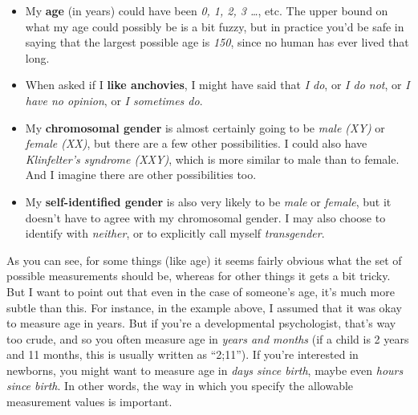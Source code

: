 \documentclass[
]{book}
\providecommand{\tightlist}{%
  \setlength{\itemsep}{0pt}\setlength{\parskip}{0pt}}
\begin{document}
\begin{itemize}
\tightlist
\item
  My \textbf{age} (in years) could have been \emph{0, 1, 2, 3 \ldots{}}, etc. The upper bound on what my age could possibly be is a bit fuzzy, but in practice you'd be safe in saying that the largest possible age is \emph{150}, since no human has ever lived that long.
\item
  When asked if I \textbf{like anchovies}, I might have said that \emph{I do}, or \emph{I do not}, or \emph{I have no opinion}, or \emph{I sometimes do}.
\item
  My \textbf{chromosomal gender} is almost certainly going to be \emph{male (XY)} or \emph{female (XX)}, but there are a few other possibilities. I could also have \emph{Klinfelter's syndrome (XXY)}, which is more similar to male than to female. And I imagine there are other possibilities too.
\item
  My \textbf{self-identified gender} is also very likely to be \emph{male} or \emph{female}, but it doesn't have to agree with my chromosomal gender. I may also choose to identify with \emph{neither}, or to explicitly call myself \emph{transgender}.
\end{itemize}

As you can see, for some things (like age) it seems fairly obvious what the set of possible measurements should be, whereas for other things it gets a bit tricky. But I want to point out that even in the case of someone's age, it's much more subtle than this. For instance, in the example above, I assumed that it was okay to measure age in years. But if you're a developmental psychologist, that's way too crude, and so you often measure age in \emph{years and months} (if a child is 2 years and 11 months, this is usually written as ``2;11''). If you're interested in newborns, you might want to measure age in \emph{days since birth}, maybe even \emph{hours since birth}. In other words, the way in which you specify the allowable measurement values is important.
\end{document}
